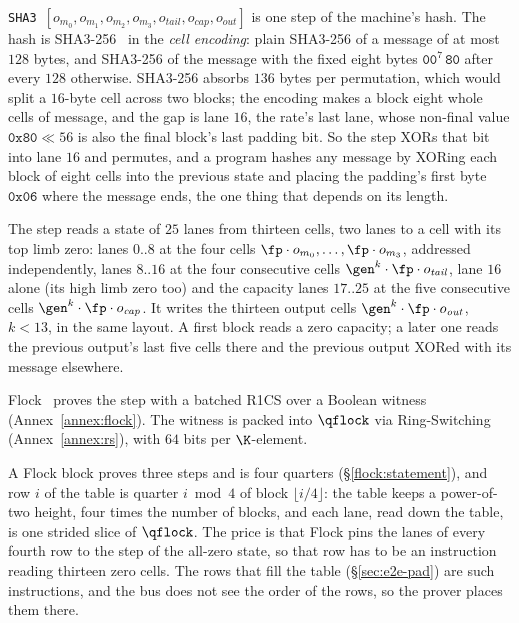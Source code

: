 \texttt{SHA3}\ $[o_{m_0},o_{m_1},o_{m_2},o_{m_3},o_{\mathit{tail}},o_{\mathit{cap}},o_{\mathit{out}}]$ is one step of the machine's hash. The hash is SHA3-256~\cite{fips202} in the \emph{cell encoding}: plain SHA3-256 of a message of at most $128$ bytes, and SHA3-256 of the message with the fixed eight bytes $\mathtt{00}^{7}\,\mathtt{80}$ after every $128$ otherwise. SHA3-256 absorbs $136$ bytes per permutation, which would split a $16$-byte cell across two blocks; the encoding makes a block eight whole cells of message, and the gap is lane $16$, the rate's last lane, whose non-final value $\mathtt{0x80}\ll 56$ is also the final block's last padding bit. So the step XORs that bit into lane $16$ and permutes, and a program hashes any message by XORing each block of eight cells into the previous state and placing the padding's first byte $\mathtt{0x06}$ where the message ends, the one thing that depends on its length.

The step reads a state of $25$ lanes from thirteen cells, two lanes to a cell with its top limb zero: lanes $0..8$ at the four cells $\fp\cdot o_{m_0},\dots,\fp\cdot o_{m_3}$, addressed independently, lanes $8..16$ at the four consecutive cells $\gen^{k}\cdot\fp\cdot o_{\mathit{tail}}$, lane $16$ alone (its high limb zero too) and the capacity lanes $17..25$ at the five consecutive cells $\gen^{k}\cdot\fp\cdot o_{\mathit{cap}}$. It writes the thirteen output cells $\gen^{k}\cdot\fp\cdot o_{\mathit{out}}$, $k<13$, in the same layout. A first block reads a zero capacity; a later one reads the previous output's last five cells there and the previous output XORed with its message elsewhere.

Flock~\cite{Flock26} proves the step with a batched R1CS over a Boolean witness (Annex~\ref{annex:flock}). The witness is packed into $\qflock$ via Ring-Switching (Annex~\ref{annex:rs}), with $64$ bits per $\K$-element.

A Flock block proves three steps and is four quarters (\S\ref{flock:statement}), and row $i$ of the table is quarter $i \bmod 4$ of block $\lfloor i/4\rfloor$: the table keeps a power-of-two height, four times the number of blocks, and each lane, read down the table, is one strided slice of $\qflock$. The price is that Flock pins the lanes of every fourth row to the step of the all-zero state, so that row has to be an instruction reading thirteen zero cells. The rows that fill the table (\S\ref{sec:e2e-pad}) are such instructions, and the bus does not see the order of the rows, so the prover places them there.

